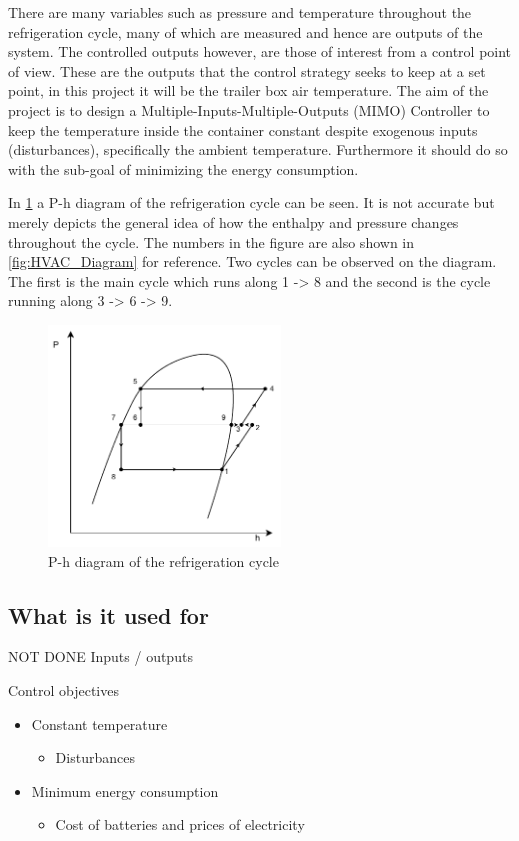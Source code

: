 There are many variables such as pressure and temperature throughout the refrigeration cycle, many of which are measured and hence are outputs of the system. 
The controlled outputs however, are those of interest from a control point of view. These are the outputs that the control strategy seeks to keep at a set point, in this project it will be the trailer box air temperature. The aim of the project is to design a Multiple-Inputs-Multiple-Outputs (MIMO) Controller to keep the temperature inside the container constant despite exogenous inputs (disturbances), specifically the ambient temperature. Furthermore it should do so with the sub-goal of minimizing the energy consumption.


In \cref{fig:p-h_diagram} a P-h diagram of the refrigeration cycle can be seen. It is not accurate but merely depicts the general idea of how the enthalpy and pressure changes throughout the cycle. The numbers in the figure are also shown in \cref{fig:HVAC_Diagram} for reference. Two cycles can be observed on the diagram. The first is the main cycle which runs along 1 -> 8 and the second is the cycle running along 3 -> 6 -> 9.

\begin{figure}[h!]
	\centering
	\includegraphics[width=0.55\textwidth]{Graphics/Flash_Tank_P-h_Diagram}
	\caption{P-h diagram of the refrigeration cycle}
	\label{fig:p-h_diagram}
\end{figure}




\subsection{What is it used for}


	
NOT DONE
Inputs / outputs

Control objectives
\begin{itemize}
	\item Constant temperature
		\begin{itemize}
			\item Disturbances
		\end{itemize}
	\item Minimum energy consumption
		\begin{itemize}
			\item Cost of batteries and prices of electricity
		\end{itemize}
\end{itemize}

		
